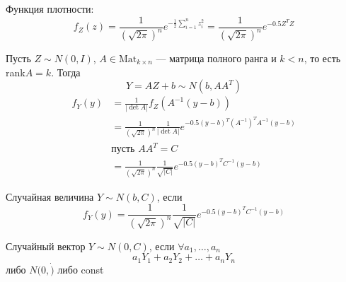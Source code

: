 \documentclass[a4paper, 10pt]{article}
\begin{document}
Функция плотности:
\begin{equation*}
    f_Z(z)=\frac{1}{(\sqrt{2\pi})^n}e^{-\frac{1}{2}\sum_{i=1}^n z_i^2}=\frac{1}{(\sqrt{2\pi})^n}e^{-0.5Z^TZ}
\end{equation*}


\comment Пусть $Z\sim N(0,I)$, $A\in\text{Mat}_{k\times n}$ — матрица полного ранга и $k<n$, то есть rank$A=k$. Тогда
\begin{equation*}
    Y=AZ+b\sim N(b,AA^T)
\end{equation*}
\begin{equation*}
    \begin{aligned}
        f_Y(y)&=\frac{1}{|\det A|}f_Z(A^{-1}(y-b))\\
        &=\frac{1}{(\sqrt{2\pi})^n}\frac{1}{|\det A|}e^{-0.5(y-b)^T(A^{-1})^TA^{-1}(y-b)}\\
        &\text{пусть }AA^T=C\\
        &=\frac{1}{(\sqrt{2\pi})^n}\frac{1}{\sqrt{|C|}}e^{-0.5(y-b)^TC^{-1}(y-b)}
    \end{aligned}
\end{equation*}


\begin{definition}
    Случайная величина $Y\sim N(b,C)$, если
    \begin{equation*}
        f_Y(y)=\frac{1}{(\sqrt{2\pi})^n}\frac{1}{\sqrt{|C|}}e^{-0.5(y-b)^TC^{-1}(y-b)}
    \end{equation*}
\end{definition}

\begin{definition}
    Случайный вектор $Y\sim N(0,C)$, если $\forall a_1,\ldots,a_n$
    \begin{equation*}
        a_1Y_1+a_2Y_2+\ldots+a_nY_n
    \end{equation*}
    либо $N(0,\dot)$ либо const
\end{definition}
\end{document}
